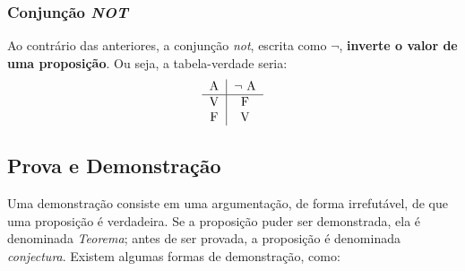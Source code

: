 \documentclass[13pt,letterpaper]{article}
\begin{document}
\subsubsection{Conjunção \emph{NOT}}
Ao contrário das anteriores, a conjunção \emph{not}, escrita como $\lnot$, \textbf{inverte o valor de uma proposição}. Ou seja, a tabela-verdade seria:
\begin{align*}
    \begin{tabular}{c|c}
        A & $\lnot$ A  \\
        \hline
        V & F \\
        F & V \\
    \end{tabular}
\end{align*}

\subsection{Prova e Demonstração}
Uma demonstração consiste em uma argumentação, de forma irrefutável, de que uma proposição é verdadeira. Se a proposição puder ser demonstrada, ela é denominada \emph{Teorema}; antes de ser provada, a proposição é denominada \emph{conjectura}.
Existem algumas formas de demonstração, como:
\end{document}

